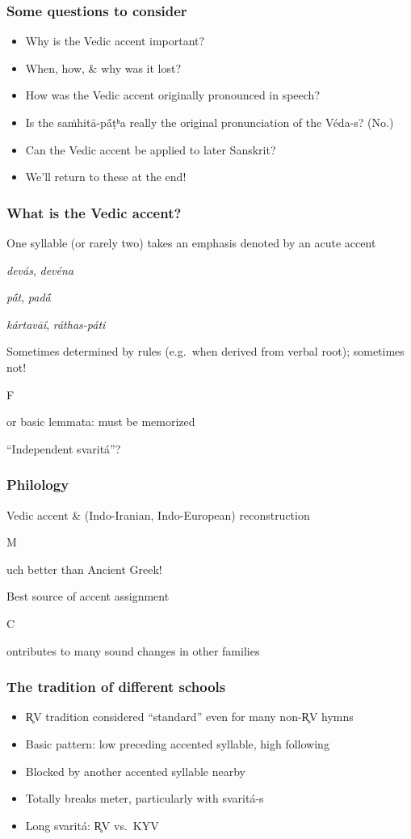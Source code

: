 \documentclass[pdf]{beamer}
\newcommand{\Subitem}[1]{{\setlength\itemindent{12pt} \item[-] #1}}
\begin{document}
\begin{frame}[label=questions] \frametitle{Some questions to consider}
\begin{itemize}
	\item Why is the Vedic accent important?
	\item When, how, \& why was it lost?
	\item How was the Vedic accent originally pronounced in speech?
	\item Is the saṁhitā-pā́ṭʰa really the original pronunciation of the Véda-s? (No.)
	\item Can the Vedic accent be applied to later Sanskrit?
	\item We'll return to these at the end!
\end{itemize}
\end{frame}

\begin{frame} \frametitle{What is the Vedic accent?}
\begin{itemize}
	\item One syllable (or rarely two) takes an emphasis denoted by an acute accent
	\Subitem {\textit{devás}, \textit{devéna}}
	\Subitem {\textit{pā́t}, \textit{padā́}}
	\Subitem {\textit{kártavāí}, \textit{ráthas-páti}}
	\item Sometimes determined by rules (e.g.~when derived from verbal root); sometimes not!
	\Subitem For basic lemmata: must be memorized
	\item ``Independent svaritá''?
\end{itemize}
\end{frame}

\begin{frame} \frametitle{Philology}
\begin{itemize}
	\item Vedic accent \& (Indo-Iranian, Indo-European) reconstruction
	\Subitem Much better than Ancient Greek!
	\item Best source of accent assignment
	\Subitem Contributes to many sound changes in other families
\end{itemize}
\end{frame}

\begin{frame} \frametitle{The tradition of different schools}
\begin{itemize}
	\item R̥V tradition considered ``standard'' even for many non-R̥V hymns
	\item Basic pattern: low preceding accented syllable, high following
	\item Blocked by another accented syllable nearby
	\item Totally breaks meter, particularly with svaritá-s
	\item Long svaritá: R̥V vs.~KYV
\end{itemize}
\end{frame}
\end{document}
